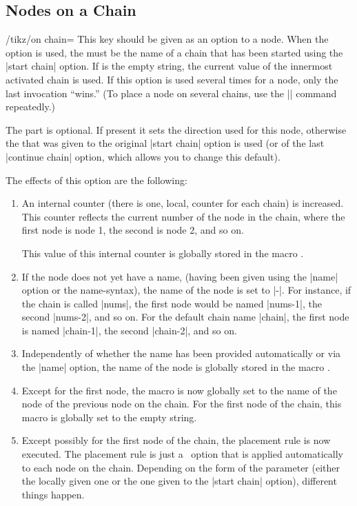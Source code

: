 \subsection{Nodes on a Chain}

\begin{key}{/tikz/on chain=}
  This key should be given as an option to a node. When the option is
  used, the  must be the name of a chain that has
  been started using the |start chain| option. If  is
  the empty string, the current value of the innermost activated chain
  is used. If this option is used several times for a node, only the
  last invocation ``wins.'' (To place a node on several chains, use
  the |\chainin| command repeatedly.)

  The  part is optional. If present it sets the
  direction used for this node, otherwise the 
  that was given to the original |start chain| option is used (or of
  the last |continue chain| option, which allows you to change this
  default).

  The effects of this option are the following:
  \begin{enumerate}
  \item An internal counter (there is one, local, counter
    for each chain) is increased. This counter reflects the current
    number of the node in the chain, where the first node is node 1,
    the second is node 2, and so on.

    This value of this internal counter is globally stored in the
    macro \declare{|\tikzchaincount|}.
  \item If the node does not yet have a name, (having been given using
    the |name| option or the name-syntax), the name of the node is set to
    |-|. For instance, if the chain is called |nums|, the first
    node would be named |nums-1|, the second |nums-2|, and so on. For
    the default chain name |chain|, the first node is named |chain-1|,
    the second |chain-2|, and so on.
  \item Independently of whether the name has been provided
    automatically or via the |name| option, the name of the node is
    globally stored in the macro \declare{|\tikzchaincurrent|}.
  \item Except for the first node, the macro
    \declare{|\tikzchainprevious|} is now globally set to the name of
    the node of the previous node on the chain. For the first node of
    the chain, this macro is globally set to the empty string.
  \item Except possibly for the first node of the chain, the placement
    rule is now executed. The placement rule is just a \tikzname\ option
    that is applied automatically to each node on the chain. Depending
    on the form of the  parameter (either the locally
    given one or the one given to the |start chain| option), different
    things happen.


\end{enumerate}
\end{key}
